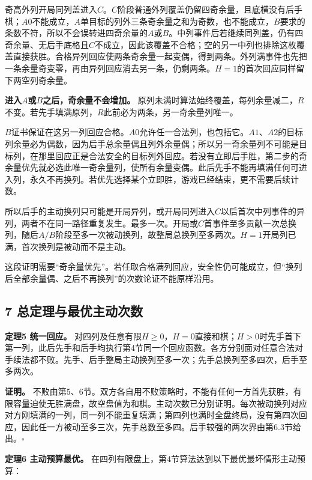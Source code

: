 \documentclass[
  a4paper,
]{article}
\begin{document}
奇高外列开局同列盖进入\(C\)。\(C\)阶段普通外列覆盖仍留四奇余量，且底横没有后手棋；\(A0\)不能成立，\(A\)单目标的列外三条奇余量之和为奇数，也不能成立，\(B\)要求的条数不符，所以不会误转进四奇余量的\(A\)或\(B\)。中列事件后若继续同列盖，仍有四奇余量、无后手底格且\(C\)不成立，因此该覆盖不合格；空的另一中列也排除这枚覆盖直接获胜。合格异列回应使两条奇余量一起变偶，得到两条。外列满事件也先把一条余量奇变零，再由异列回应消去另一条，仍剩两条。\(H=1\)的首次回应同样留下两空列奇余量。

\textbf{进入\(A\)或\(B\)之后，奇余量不会增加。}
原列未满时算法始终覆盖，每列余量减二，\(R\)不变。若先手填满原列，\(R\)此前必为两条，另一奇余量列唯一。

\(B\)证书保证在这另一列回应合格。\(A0\)允许任一合法列，也包括它。\(A1\)、\(A2\)的目标列余量必为偶数，因为后手总余量偶且列外余量偶；所以另一奇余量列不可能是目标列，在那里回应正是合法安全的目标列外回应。若没有立即后手胜，第二步的奇余量优先就必选此唯一奇余量列，使所有余量变偶。此后先手不能再填满任何可进入列，永久不再换列。若优先选择某个立即胜，游戏已经结束，更不需要后续计数。

所以后手的主动换列只可能是开局异列，或开局同列进入\(C\)以后首次中列事件的异列，两者不在同一路径重复发生。最多一次。开局或\(C\)首事件至多贡献一次总换列，随\(\text{后}A/B\)阶段至多一次被动换列，故整局总换列至多两次。\(H=1\)开局列已满，首次换列是被动而不是主动。

这段证明需要``奇余量优先''。若任取合格满列回应，安全性仍可能成立，但``换列后全部余量偶、之后不再换列''的次数论证不能原样沿用。

\subsection{7
总定理与最优主动次数}\label{ux603bux5b9aux7406ux4e0eux6700ux4f18ux4e3bux52a8ux6b21ux6570}

\textbf{定理5 统一回应。}
对四列及任意有限\(H\ge 0\)，\(H=0\)直接和棋；\(H>0\)时先手首下第一列，此后先手和后手均执行第4节同一个回应函数。各方分别面对任意合法对手续法都不败。先手、后手整局主动换列至多一次；先手总换列至多四次，后手至多两次。

\textbf{证明。}
不败由第5、6节。双方各自用不败策略时，不能有任何一方首先获胜，有限容量迫使无胜满盘，故空盘值为和棋。主动次数已分别证明。每次被动换列对应对方刚填满的一列，同一列不能重复填满；第四列也满时全盘终局，没有第四次回应，因此任一方被动至多三次，先手总数至多四。后手较强的两次界由第6.3节给出。\(\square\)

\textbf{定理6 主动预算最优。}
在四列有限盘上，第4节算法达到以下最优最坏情形主动预算：
\end{document}

